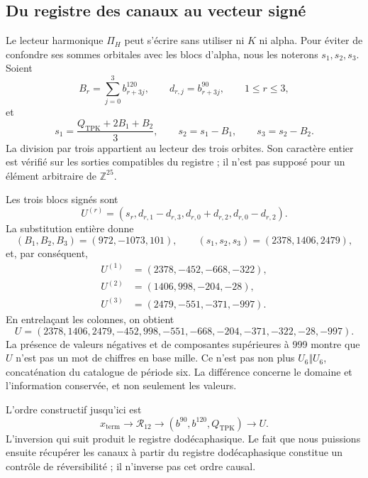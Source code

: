 \subsection{Du registre des canaux au vecteur signé}
\label{subsec:k-pi-h}

Le lecteur harmonique \(\Pi_H\) peut s'écrire sans utiliser ni \(K\) ni
alpha. Pour éviter de confondre ses sommes orbitales avec les blocs d'alpha,
nous les noterons \(s_1,s_2,s_3\). Soient
\[
 B_r=\sum_{j=0}^{3}b^{120}_{r+3j},\qquad
 d_{r,j}=b^{90}_{r+3j},\qquad1\leq r\leq3,
\]
et
\begin{equation}
 s_1=\frac{Q_{\mathrm{TPK}}+2B_1+B_2}{3},\qquad
 s_2=s_1-B_1,\qquad s_3=s_2-B_2.
 \label{eq:k-sumas-armonicas}
\end{equation}
La division par trois appartient au lecteur des trois orbites. Son caractère entier est vérifié sur les sorties compatibles du registre ; il n'est pas supposé pour un élément arbitraire de \(\mathbb Z^{25}\).

Les trois blocs signés sont
\begin{equation}
 U^{(r)}=(s_r,d_{r,1}-d_{r,3},d_{r,0}+d_{r,2},d_{r,0}-d_{r,2}).
 \label{eq:k-bloques-firmados}
\end{equation}
La substitution entière donne
\[
 (B_1,B_2,B_3)=(972,-1073,101),\qquad
 (s_1,s_2,s_3)=(2378,1406,2479),
\]
et, par conséquent,
\begin{align*}
 U^{(1)}&=(2378,-452,-668,-322),\\
 U^{(2)}&=(1406,998,-204,-28),\\
 U^{(3)}&=(2479,-551,-371,-997).
\end{align*}
En entrelaçant les colonnes, on obtient
\begin{equation}
 U=(2378,1406,2479,-452,998,-551,
       -668,-204,-371,-322,-28,-997).
 \label{eq:k-u-firmado}
\end{equation}
La présence de valeurs négatives et de composantes supérieures à 999
montre que \(U\) n'est pas un mot de chiffres en base mille. Ce n'est pas non plus
\(U_6\Vert U_6\), concaténation du catalogue de période six. La différence
concerne le domaine et l'information conservée, et non seulement les valeurs.

L'ordre constructif jusqu'ici est
\[
 x_{\mathrm{term}}\longrightarrow\mathcal R_{12}
 \longrightarrow(b^{90},b^{120},Q_{\mathrm{TPK}})
 \longrightarrow U.
\]
L'inversion qui suit produit le registre dodécaphasique. Le fait que nous puissions ensuite récupérer les canaux à partir du registre dodécaphasique constitue un contrôle de réversibilité ; il n'inverse pas cet ordre causal.

